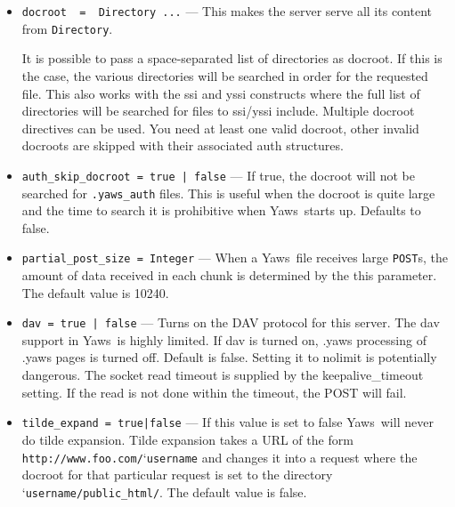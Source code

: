 \documentclass[11pt,oneside,english]{book}
\newcommand{\Yaws}            %
        {{\sc Yaws}}
\begin{document}
\begin{itemize}
\item       \verb+docroot  =  Directory ...+ ---
              This makes the server serve all its content from
              \verb+Directory+.

              It is possible to pass a space-separated list of directories as
              docroot. If this is the case, the various directories will be
              searched in order for the requested file. This also works with the
              ssi and yssi constructs where the full list of directories will be
              searched for files to ssi/yssi include. Multiple docroot
              directives can be used.  You need at least one valid docroot,
              other invalid docroots are skipped with their associated auth
              structures.

\item       \verb+auth_skip_docroot = true | false+ ---
              If true, the docroot will not be searched for
              \verb+.yaws_auth+ files. This is useful when the
              docroot is quite large and the time to search it is
              prohibitive when \Yaws\  starts up. Defaults to false.

\item       \verb+partial_post_size = Integer+ ---
              When a \Yaws\  file receives large  \verb+POST+s,  the
              amount  of  data  received  in each chunk is
              determined by the this parameter.  The default
              value is 10240.

\item       \verb+dav = true | false+ ---
              Turns on the DAV protocol for this server. The dav support in
              \Yaws\ is highly limited. If dav is turned on, .yaws processing of
              .yaws pages is turned off. Default is false. Setting it to nolimit
              is potentially dangerous. The socket read timeout is supplied by
              the keepalive\_timeout setting. If the read is not done within the
              timeout, the POST will fail.

\item       \verb+tilde_expand = true|false+ ---
              If  this  value  is  set  to false \Yaws\  will
              never do tilde  expansion.  Tilde expansion takes a URL
              of the form
              \verb+http://www.foo.com/+\char`\~\verb+username+ and
              changes it into a request where the docroot for that
              particular request is set to the directory
              \char`\~\verb+username/public_html/+. The default value
              is false.


\end{itemize}
\end{document}
